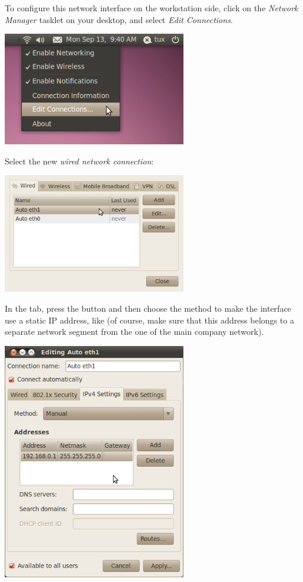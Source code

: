 To configure this network interface on the workstation side, click on
the {\em Network Manager} tasklet on your desktop, and select {\em
  Edit Connections}.

\begin{center}
\includegraphics[width=8cm]{labs/sysdev-u-boot/network-config-1.png}
\end{center}

Select the new {\em wired network connection}:

\begin{center}
\includegraphics[width=8cm]{labs/sysdev-u-boot/network-config-2.png}
\end{center}

In the  tab, press the  button
and then choose the  method to make the interface use
a static IP address, like  (of course, make sure
that this address belongs to a separate network segment from the one
of the main company network).

\begin{center}
\includegraphics[width=8cm]{labs/sysdev-u-boot/network-config-3.png}
\end{center}

